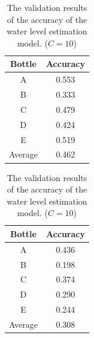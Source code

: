 \documentclass[sigconf]{acmart}
\begin{document}
\begin{table}[!t]
  \small
  \centering
  \caption{The validation results of the accuracy of the water level estimation model. ($C=10$)}
  \begin{minipage}[t]{0.45\linewidth}
    \centering
    \begin{tabular}{c|c} \hline\hline
    Bottle & Accuracy \\ \hline
    A & 0.553 \\
    B & 0.333 \\
    C & 0.479 \\
    D & 0.424 \\
    E & 0.519 \\ \hline
    Average & 0.462 \\ \hline
    \end{tabular}
    \label{tab:result_10_dependent}
  \end{minipage}
  \begin{minipage}[t]{0.45\linewidth}
    \centering
    \begin{tabular}{c|c} \hline\hline
    Bottle & Accuracy \\ \hline
    A & 0.436 \\
    B & 0.198 \\
    C & 0.374 \\
    D & 0.290 \\
    E & 0.244 \\ \hline
    Average & 0.308 \\ \hline
    \end{tabular}
    \label{tab:result_10_independent}
  \end{minipage}
  \label{tab:result_10}
\end{table}
\end{document}
